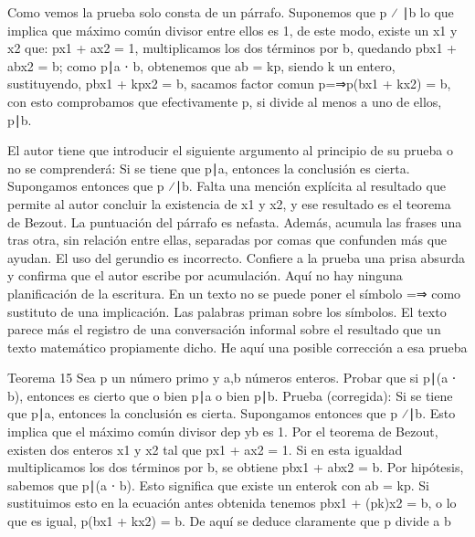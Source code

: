 Como vemos la prueba solo consta de un párrafo.
Suponemos que p ⁄ ∣b lo que implica que máximo común divisor entre ellos es 1, de este modo, existe un x1 y x2 que: px1 + ax2 = 1, multiplicamos los dos términos por b, quedando pbx1 + abx2 = b; como p∣a ⋅ b, obtenemos que ab = kp, siendo k un entero, sustituyendo, pbx1 + kpx2 = b, sacamos factor comun p=⇒p(bx1 + kx2) = b, con esto comprobamos que efectivamente p, si divide al menos a uno de ellos, p∣b.

El autor tiene que introducir el siguiente argumento al principio de su prueba o no se comprenderá: Si se tiene que p∣a, entonces la conclusión es cierta. Supongamos entonces que
p ⁄∣b.
Falta una mención explícita al resultado que permite al autor concluir la existencia de x1 y x2, y ese resultado es el teorema de Bezout.
La puntuación del párrafo es nefasta. Además, acumula las frases una tras otra, sin relación entre ellas, separadas por comas que confunden más que ayudan.
El uso del gerundio es incorrecto. Confiere a la prueba una prisa absurda y confirma que el autor escribe por acumulación. Aquí no hay ninguna planificación de la escritura.
En un texto no se puede poner el símbolo =⇒ como sustituto de una implicación. Las palabras priman sobre los símbolos.
El texto parece más el registro de una conversación informal sobre el resultado que un texto matemático propiamente dicho.
He aquí una posible corrección a esa prueba

Teorema 15 Sea p un número primo y a,b números enteros. Probar que si p∣(a ⋅ b), entonces es cierto que o bien p∣a o bien p∣b.
Prueba (corregida): Si se tiene que p∣a, entonces la conclusión es cierta. Supongamos entonces que p ⁄∣b. Esto implica que el máximo común divisor dep yb es 1. Por el teorema de Bezout, existen dos enteros x1 y x2 tal que px1 + ax2 = 1. Si en esta igualdad multiplicamos los dos términos por b, se obtiene pbx1 + abx2 = b. Por hipótesis, sabemos que p∣(a ⋅ b). Esto significa que existe un enterok con ab = kp. Si sustituimos esto en la ecuación antes obtenida tenemos pbx1 + (pk)x2 = b, o lo que es igual, p(bx1 + kx2) = b. De aquí se deduce claramente que p divide a b